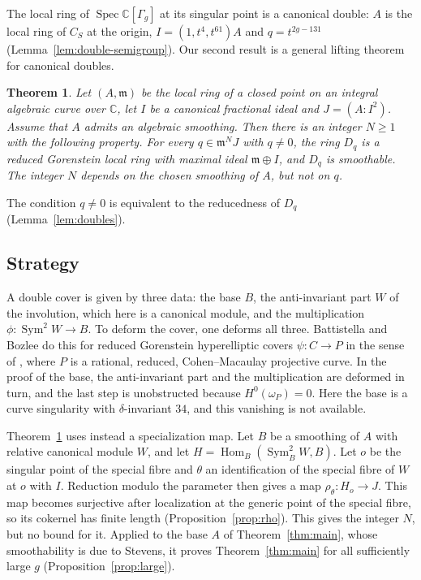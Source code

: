 \documentclass{amsart}
\newtheorem{theorem}{Theorem}[section]
\theoremstyle{definition}
\theoremstyle{remark}
\numberwithin{equation}{section}
\newcommand{\C}{\mathbb{C}}
\newcommand{\m}{\mathfrak{m}}
\DeclareMathOperator{\Hom}{Hom}
\DeclareMathOperator{\Spec}{Spec}
\DeclareMathOperator{\Sym}{Sym}
\begin{document}
The local ring of $\Spec\C[\Gamma_g]$ at its singular point is a canonical double: $A$ is the local ring of $C_S$ at the origin, $I=(1,t^4,t^{61})A$ and $q=t^{2g-131}$ (Lemma~\ref{lem:double-semigroup}). Our second result is a general lifting theorem for canonical doubles.

\begin{theorem}\label{thm:general}
Let $(A,\m)$ be the local ring of a closed point on an integral algebraic curve over $\C$, let $I$ be a canonical fractional ideal and $J=(A:I^2)$. Assume that $A$ admits an algebraic smoothing. Then there is an integer $N\ge 1$ with the following property. For every $q\in\m^NJ$ with $q\ne 0$, the ring $D_q$ is a reduced Gorenstein local ring with maximal ideal $\m\oplus I$, and $D_q$ is smoothable. The integer $N$ depends on the chosen smoothing of $A$, but not on $q$.
\end{theorem}

The condition $q\neq0$ is equivalent to the reducedness of $D_q$ (Lemma~\ref{lem:doubles}).

\subsection*{Strategy}
A double cover is given by three data: the base $B$, the anti-invariant part $W$ of the involution, which here is a canonical module, and the multiplication $\phi\colon\Sym^2W\to B$. To deform the cover, one deforms all three. Battistella and Bozlee do this for reduced Gorenstein hyperelliptic covers $\psi\colon C\to P$ in the sense of \cite[Definition~4.1]{BB}, where $P$ is a rational, reduced, Cohen--Macaulay projective curve. In the proof of \cite[Corollary~4.4]{BB} the base, the anti-invariant part and the multiplication are deformed in turn, and the last step is unobstructed because $H^0(\omega_P)=0$. Here the base is a curve singularity with $\delta$-invariant $34$, and this vanishing is not available.

Theorem~\ref{thm:general} uses instead a specialization map. Let $B$ be a smoothing of $A$ with relative canonical module $W$, and let $H=\Hom_B(\Sym^2_BW,B)$. Let $o$ be the singular point of the special fibre and $\theta$ an identification of the special fibre of $W$ at $o$ with $I$. Reduction modulo the parameter then gives a map $\rho_\theta\colon H_o\to J$. This map becomes surjective after localization at the generic point of the special fibre, so its cokernel has finite length (Proposition~\ref{prop:rho}). This gives the integer $N$, but no bound for it. Applied to the base $A$ of Theorem~\ref{thm:main}, whose smoothability is due to Stevens, it proves Theorem~\ref{thm:main} for all sufficiently large $g$ (Proposition~\ref{prop:large}).
\end{document}
